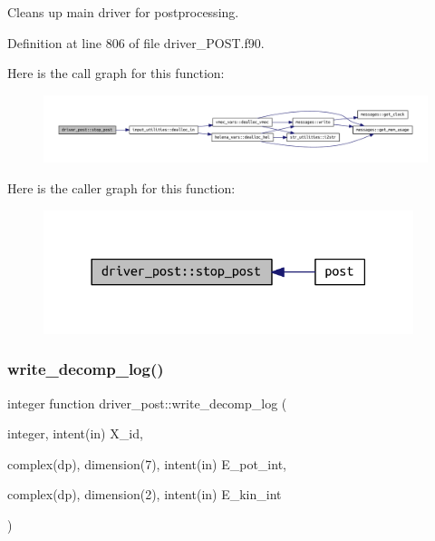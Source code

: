 Cleans up main driver for postprocessing. 



Definition at line 806 of file driver\+\_\+\+P\+O\+S\+T.\+f90.

Here is the call graph for this function\+:\nopagebreak
\begin{figure}[H]
\begin{center}
\leavevmode
\includegraphics[width=350pt]{namespacedriver__post_a71f9fb1935222111e1c7cfc15c5d0269_cgraph}
\end{center}
\end{figure}
Here is the caller graph for this function\+:\nopagebreak
\begin{figure}[H]
\begin{center}
\leavevmode
\includegraphics[width=306pt]{namespacedriver__post_a71f9fb1935222111e1c7cfc15c5d0269_icgraph}
\end{center}
\end{figure}
\mbox{\label{namespacedriver__post_a4981c6c0e63b862c92ba240f43e22e77}} 
\subsubsection{\texorpdfstring{write\+\_\+decomp\+\_\+log()}{write\_decomp\_log()}}
{\footnotesize\ttfamily integer function driver\+\_\+post\+::write\+\_\+decomp\+\_\+log (\begin{DoxyParamCaption}\item[{integer, intent(in)}]{X\+\_\+id,  }\item[{complex(dp), dimension(7), intent(in)}]{E\+\_\+pot\+\_\+int,  }\item[{complex(dp), dimension(2), intent(in)}]{E\+\_\+kin\+\_\+int }\end{DoxyParamCaption})}



